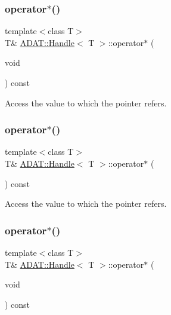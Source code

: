 \subsubsection{\texorpdfstring{operator$\ast$()}{operator*()}\hspace{0.1cm}{\footnotesize\ttfamily [1/3]}}
{\footnotesize\ttfamily template$<$class T$>$ \\
T\& \mbox{\hyperlink{classADAT_1_1Handle}{A\+D\+A\+T\+::\+Handle}}$<$ T $>$\+::operator$\ast$ (\begin{DoxyParamCaption}\item[{void}]{ }\end{DoxyParamCaption}) const\hspace{0.3cm}{\ttfamily [inline]}}



Access the value to which the pointer refers. 

\mbox{\label{classADAT_1_1Handle_a86f851b3a2e8a6084e50bfad306260f4}} 
\subsubsection{\texorpdfstring{operator$\ast$()}{operator*()}\hspace{0.1cm}{\footnotesize\ttfamily [2/3]}}
{\footnotesize\ttfamily template$<$class T$>$ \\
T\& \mbox{\hyperlink{classADAT_1_1Handle}{A\+D\+A\+T\+::\+Handle}}$<$ T $>$\+::operator$\ast$ (\begin{DoxyParamCaption}{ }\end{DoxyParamCaption}) const\hspace{0.3cm}{\ttfamily [inline]}}



Access the value to which the pointer refers. 

\mbox{\label{classADAT_1_1Handle_a86f851b3a2e8a6084e50bfad306260f4}} 
\subsubsection{\texorpdfstring{operator$\ast$()}{operator*()}\hspace{0.1cm}{\footnotesize\ttfamily [3/3]}}
{\footnotesize\ttfamily template$<$class T$>$ \\
T\& \mbox{\hyperlink{classADAT_1_1Handle}{A\+D\+A\+T\+::\+Handle}}$<$ T $>$\+::operator$\ast$ (\begin{DoxyParamCaption}\item[{void}]{ }\end{DoxyParamCaption}) const\hspace{0.3cm}{\ttfamily [inline]}}



